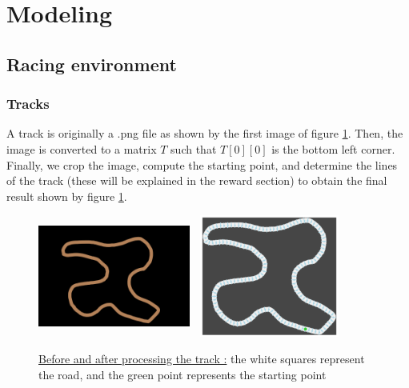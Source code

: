 \documentclass[11pt,a4paper]{article}
\newcounter{fig}
\begin{document}
	\section*{Modeling}
		\subsection*{Racing environment}
			\subsubsection*{Tracks}
A track is originally a .png file as shown by the first image of figure \ref{figure:track}.
 Then, the image is converted to a matrix $T$ such that $T[0][0]$ is the bottom left corner. 
 Finally, we crop the image, compute the starting point, and determine the lines of the track (these will be explained in the reward section) to obtain the final result shown by figure \ref{figure:track}. 
 

\begin{center}
	\begin{figure}[ht]
		\centering
		\includegraphics[width=5cm, height=4cm]{track_06.png}
		\includegraphics[width=5cm, height=4cm]{track_06_computed.png}
		\caption{\underline{Before and after processing the track :} the white squares represent the road, and the green point represents the starting point }
		\label{figure:track}
	\end{figure}
\end{center}
	
\end{document}
